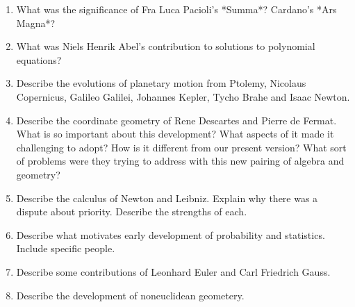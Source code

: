 \documentclass[11pt,fleqn]{article}
\begin{document}
\begin{enumerate}
\item What was the significance of Fra Luca Pacioli's *Summa*? Cardano's *Ars Magna*?
\item What was Niels Henrik Abel's contribution to solutions to polynomial equations?
\item Describe the evolutions of planetary motion from Ptolemy, Nicolaus Copernicus, Galileo Galilei, Johannes Kepler, Tycho Brahe and Isaac Newton.
\item Describe the coordinate geometry of Rene Descartes and Pierre de Fermat. What is so important about this development? What aspects of it made it challenging to adopt? How is it different from our present version? What sort of problems were they trying to address with this new pairing of algebra and geometry?
\item Describe the calculus of Newton and Leibniz. Explain why there was a dispute about priority. Describe the strengths of each.
\item Describe what motivates early development of probability and statistics. Include specific people.
\item Describe some contributions of Leonhard Euler and Carl Friedrich Gauss.
\item Describe the development of noneuclidean geometery. 
\end{enumerate}
\end{document}
